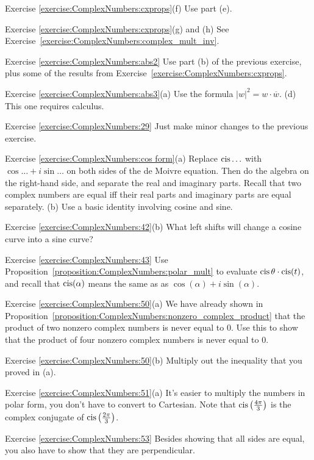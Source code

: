 \noindent Exercise \ref{exercise:ComplexNumbers:cxprops}(f)
 Use part (e).

\noindent Exercise \ref{exercise:ComplexNumbers:cxprops}(g) and (h)
See Exercise~\ref{exercise:ComplexNumbers:complex_mult_inv}.


\noindent Exercise \ref{exercise:ComplexNumbers:abs2}
Use part (b) of the previous exercise, plus
some of the results from Exercise~\ref{exercise:ComplexNumbers:cxprops}.


\noindent Exercise \ref{exercise:ComplexNumbers:abs3}(a)
Use the formula $|w|^2 = w\cdot \overline{w}$.  (d) This one requires calculus.

\noindent Exercise \ref{exercise:ComplexNumbers:29}
Just make minor changes to the previous exercise.

\noindent Exercise \ref{exercise:ComplexNumbers:cos form}(a) Replace $\operatorname{cis} \ldots$ with $\cos \ldots + i \sin \ldots$ on both sides of the de Moivre equation.  Then do the algebra on the right-hand side, and separate the real and imaginary parts. Recall that two complex numbers are equal iff their real parts and imaginary parts are equal separately.
(b)
Use a basic identity involving cosine and sine.

\noindent Exercise \ref{exercise:ComplexNumbers:42}(b)
What left shifts will change a cosine curve into a sine curve?

\noindent Exercise \ref{exercise:ComplexNumbers:43}
 Use Proposition~\ref{proposition:ComplexNumbers:polar_mult} to evaluate $\operatorname{cis}\theta \cdot \operatorname{cis}( t)$, and recall that $\operatorname{cis}(\alpha)$ means the same as as $\cos(\alpha) + i \sin(\alpha)$.


\noindent Exercise \ref{exercise:ComplexNumbers:50}(a)
We have already shown  in Proposition~\ref{proposition:ComplexNumbers:nonzero_complex_product} that the product of two nonzero complex numbers is never equal to 0. Use this to show that the product of four nonzero complex numbers is never equal to 0.


\noindent Exercise \ref{exercise:ComplexNumbers:50}(b)
Multiply out the inequality that you proved in (a).

\noindent Exercise \ref{exercise:ComplexNumbers:51}(a)
It's easier to multiply the numbers in polar form, you don't have to convert to Cartesian.  Note that $\operatorname{cis}\left(\frac{4\pi}{3}\right)$ is the complex conjugate of $\operatorname{cis}\left(\frac{2\pi}{3}\right)$.

\noindent Exercise \ref{exercise:ComplexNumbers:53}
Besides showing that all sides are equal, you also have to show that they are perpendicular.

